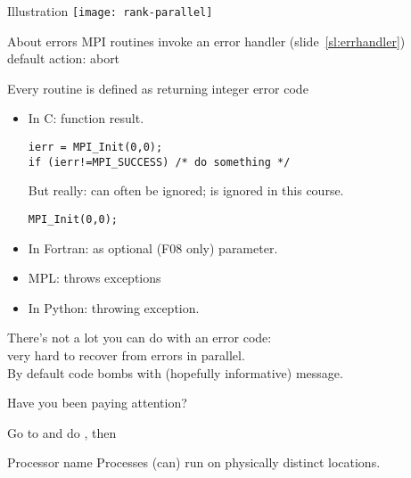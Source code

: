\begin{exerciseframe}[commrank]
  
\end{exerciseframe}

\begin{numberedframe}{Illustration}
  \texttt{[image: rank-parallel]}
\end{numberedframe}

\begin{numberedframe}{About errors}
  MPI routines invoke an error handler (slide~\ref{sl:errhandler})\\
  default action: abort
  
  Every routine is defined as returning integer error code
  \begin{itemize}
  \item In C: function result. 
\lstset{language=C++}
\begin{lstlisting}
ierr = MPI_Init(0,0);
if (ierr!=MPI_SUCCESS) /* do something */
\end{lstlisting}
  But really: can often be ignored; is ignored in this course.
\begin{lstlisting}
MPI_Init(0,0);
\end{lstlisting}
  \item In Fortran: as optional (F08 only) parameter.
  \item MPL: throws exceptions
  \item In Python: throwing exception.
  \end{itemize}
  There's not a lot you can do with an error code:\\
  very hard to recover from errors in parallel.\\
  By default code bombs with (hopefully informative) message.
\end{numberedframe}

\begin{numberedframe}{Have you been paying attention?}
  
\end{numberedframe}

\begin{exerciseframe}
  

  Go to  and do ,
  then 
\end{exerciseframe}

\begin{numberedframe}{Processor name}
  Processes (can) run on physically distinct locations.

\end{numberedframe}

